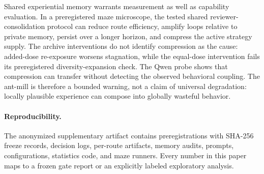 \documentclass[letterpaper]{article} %
\begin{document}
Shared experiential memory warrants measurement as well as capability evaluation. In a
preregistered maze microscope, the tested shared reviewer-consolidation protocol can reduce
route efficiency, amplify loops relative to private memory, persist over a longer horizon,
and compress the active strategy supply. The archive interventions do not identify
compression as the cause: added-dose re-exposure worsens stagnation, while the equal-dose
intervention fails its preregistered diversity-expansion check. The Qwen probe shows that
compression can transfer without detecting the observed behavioral coupling. The ant-mill is
therefore a bounded
warning, not a claim of universal degradation: locally plausible experience can compose into
globally wasteful behavior.

\paragraph{Reproducibility.}
The anonymized supplementary artifact contains preregistrations with SHA-256 freeze records,
decision logs, per-route artifacts, memory audits, prompts, configurations, statistics code,
and maze runners. Every number in this paper maps to a frozen gate report or an explicitly
labeled exploratory analysis.


\end{document}
